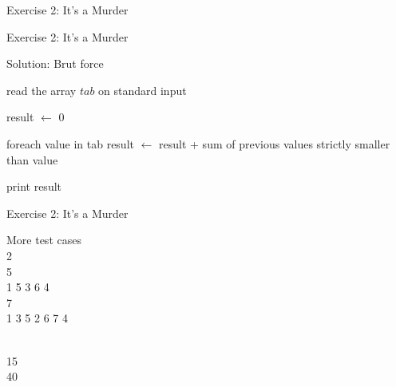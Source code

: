 \documentclass{beamer}
\begin{document}
\begin{frame}{Exercise 2: It's a Murder}
\begin{overlayarea}{\textwidth}{\textheight}

  \end{overlayarea}
\end{frame}

\begin{frame}[fragile]{Exercise 2: It's a Murder}

  \begin{code}{Solution: Brut force}
    \begin{PseudoCode}
read the array $tab$ on standard input    

result $\leftarrow$ 0

foreach value in tab
    result $\leftarrow$ result + sum of previous values strictly smaller than value

print result
    \end{PseudoCode}
  \end{code}
\end{frame}


\begin{frame}{Exercise 2: It's a Murder}

  \begin{exampleblock}{More test cases}
    \\
    2\\5\\1 5 3 6 4\\7\\1 3 5 2 6 7 4
    
    \medskip
    \\
    15\\40
  \end{exampleblock}
\end{frame}
\end{document}
